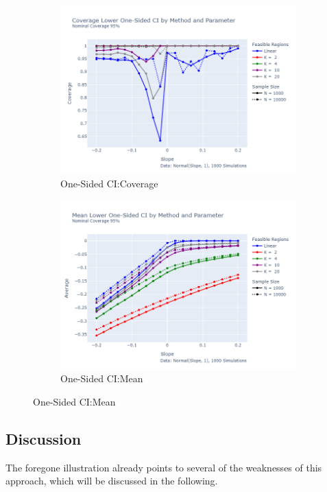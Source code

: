 \documentclass[12pt,a4paper,english]{article} %
\numberwithin{equation}{section}
\theoremstyle{definition}
\theoremstyle{remark}
\theoremstyle{plain}
\begin{document}
\begin{figure}
      \begin{subfigure}[b]{0.49\textwidth}
        \centering
        \includegraphics[width=\textwidth]{../figures/relax/covers_lower_one_sided_by_method.png}
        \caption{One-Sided CI:\@ Coverage}\label{fig:convex_relax_ci_coverage}
      \end{subfigure}
      \hfill
      \begin{subfigure}[b]{0.49\textwidth}
        \centering
        \includegraphics[width=\textwidth]{../figures/relax/lower_ci_one_sided_by_method.png}
      \caption{One-Sided CI:\@ Mean}\label{fig:convex_relax_ci_mean}
  \end{subfigure}

\end{figure}

\subsection{Discussion}
The foregone illustration already points to several of the weaknesses of this approach, which will be discussed in the following.
\end{document}
